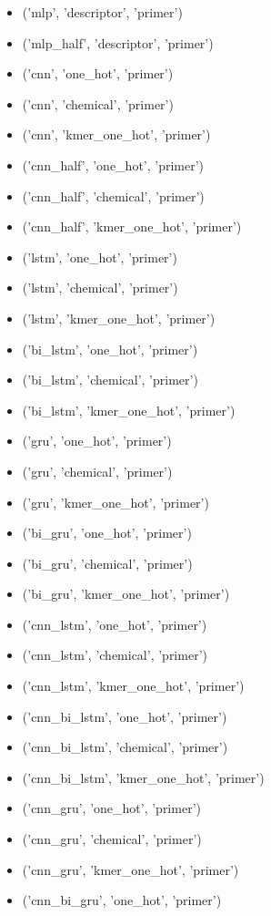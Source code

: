 \begin{itemize}
    \item ('mlp', 'descriptor', 'primer')
    \item ('mlp\_half', 'descriptor', 'primer')
    \item ('cnn', 'one\_hot', 'primer')
    \item ('cnn', 'chemical', 'primer')
    \item ('cnn', 'kmer\_one\_hot', 'primer')
    \item ('cnn\_half', 'one\_hot', 'primer')
    \item ('cnn\_half', 'chemical', 'primer')
    \item ('cnn\_half', 'kmer\_one\_hot', 'primer')
    \item ('lstm', 'one\_hot', 'primer')
    \item ('lstm', 'chemical', 'primer')
    \item ('lstm', 'kmer\_one\_hot', 'primer')
    \item ('bi\_lstm', 'one\_hot', 'primer')
    \item ('bi\_lstm', 'chemical', 'primer')
    \item ('bi\_lstm', 'kmer\_one\_hot', 'primer')
    \item ('gru', 'one\_hot', 'primer')
    \item ('gru', 'chemical', 'primer')
    \item ('gru', 'kmer\_one\_hot', 'primer')
    \item ('bi\_gru', 'one\_hot', 'primer')
    \item ('bi\_gru', 'chemical', 'primer')
    \item ('bi\_gru', 'kmer\_one\_hot', 'primer')
    \item ('cnn\_lstm', 'one\_hot', 'primer')
    \item ('cnn\_lstm', 'chemical', 'primer')
    \item ('cnn\_lstm', 'kmer\_one\_hot', 'primer')
    \item ('cnn\_bi\_lstm', 'one\_hot', 'primer')
    \item ('cnn\_bi\_lstm', 'chemical', 'primer')
    \item ('cnn\_bi\_lstm', 'kmer\_one\_hot', 'primer')
    \item ('cnn\_gru', 'one\_hot', 'primer')
    \item ('cnn\_gru', 'chemical', 'primer')
    \item ('cnn\_gru', 'kmer\_one\_hot', 'primer')
    \item ('cnn\_bi\_gru', 'one\_hot', 'primer')

\end{itemize}
